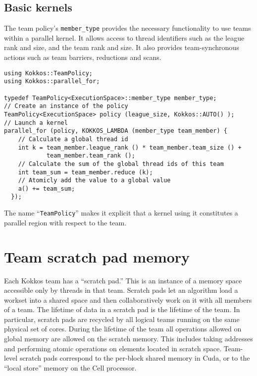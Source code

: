 \subsection{Basic kernels}\label{SS:Hierarchical:Teams:Kernels}

The team policy's \lstinline!member_type! provides the necessary functionality to use teams within a parallel kernel.
It allows access to thread identifiers such as the league rank and size, and the team rank and size.
It also provides team-synchronous actions such as team barriers, reductions and scans.
\begin{lstlisting}
using Kokkos::TeamPolicy;
using Kokkos::parallel_for;

typedef TeamPolicy<ExecutionSpace>::member_type member_type;
// Create an instance of the policy
TeamPolicy<ExecutionSpace> policy (league_size, Kokkos::AUTO() );
// Launch a kernel
parallel_for (policy, KOKKOS_LAMBDA (member_type team_member) {
    // Calculate a global thread id
    int k = team_member.league_rank () * team_member.team_size () +
            team_member.team_rank ();
    // Calculate the sum of the global thread ids of this team
    int team_sum = team_member.reduce (k);
    // Atomicly add the value to a global value
    a() += team_sum;
  });
\end{lstlisting}

The name ``\lstinline!TeamPolicy!'' makes it explicit that a kernel
using it constitutes a parallel region with respect to the team.

\section{Team scratch pad memory}\label{S:Hierarchical:Scratch}

Each Kokkos team has a ``scratch pad.''
This is an instance of a memory space accessible only by threads in that team.
Scratch pads let an algorithm load a workset into a shared space
and then collaboratively work on it with all members of a team.
The lifetime of data in a scratch pad is the lifetime of the team.
In particular, scratch pads are recycled by all logical teams running on the same physical set of cores.
During the lifetime of the team all operations allowed on global memory are allowed on the scratch memory.
This includes taking addresses and performing atomic operations on elements located in scratch space. 
Team-level scratch pads correspond to the per-block shared memory in Cuda,
or to the ``local store'' memory on the Cell processor.

